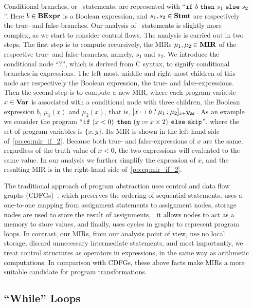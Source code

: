 Conditional branches, or \iflit~statements, are represented with ``$\texttt{if}~
b~ \texttt{then}~ s_1~ \texttt{else}~ s_2$''.  Here $b \in \mathbf{BExpr}$ is a Boolean
expression, and $s_1, s_2 \in \mathbf{Stmt}$ are respectively the true- and
false-branches.  Our analysis of \iflit~statements is slightly more complex,
as we start to consider control flows.  The analysis is carried out in two
steps.  The first step is to compute recursively, the MIRs $\mu_1, \mu_2
\in \mathbf{MIR}$ of the respective true- and false-branches, namely, $s_1$ and
$s_2$.  We introduce the conditional node ``$?$'', which is derived from
C syntax, to signify conditional branches in expressions.  The left-most,
middle and right-most children of this node are respectively the Boolean
expression, the true- and false-expressions.  Then the second step is to
compute a new MIR, where each program variable $x \in \mathbf{Var}$ is associated
with a conditional node with three children, the Boolean expression $b$,
$\mu_1(x)$ and $\mu_2(x)$, that is, $[x \mapsto b\mathbin{?}\mu_1\mathbin{:}\mu_2]_{x
\in \mathbf{Var}}$.  As an example we consider the program ``$\texttt{if}~(x < 0)$
$\texttt{then}~(y \mathbin{:=} x \times 2)$ $\texttt{else}~\mathtt{skip}$'', where the set of
program variables is $\{x, y\}$.  Its MIR is shown in the left-hand side
of~\eqref{po:eq:mir_if_2}.  Because both true- and false-expressions of $x$
are the same, regardless of the truth value of $x < 0$, the two expressions
will evaluated to the same value.  In our analysis we further simplify
the expression of $x$, and the resulting MIR is in the right-hand side
of~\eqref{po:eq:mir_if_2}.

The traditional approach of program abstraction uses control and data flow
graphs (CDFGs)~\cite{namballa04}, which preserves the ordering of sequential
statements, uses a one-to-one mapping from assignment statements to assignment
nodes, storage nodes are used to store the result of assignments, \ie~it allows
nodes to act as a memory to store values, and finally, uses cycles in graphs
to represent program loops.  In contrast, our MIRs, from our analysis point of
view, use no local storage, discard unnecessary intermediate statements, and
most importantly, we treat control structures as operators in expressions, in
the same way as arithmetic computations.  In comparison with CDFGs, these above
facts make MIRs a more suitable candidate for program transformations.

\subsection{``While'' Loops}

